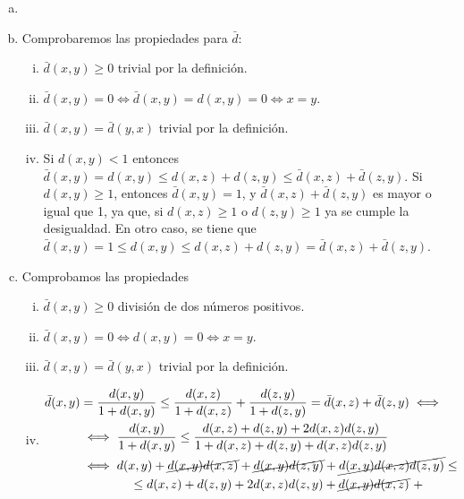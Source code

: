 \begin{eje}
    \begin{enumerate}[(a)]
        \item[]
        \item Comprobaremos las propiedades para $\bar{d}$:
            \begin{enumerate}[i)]
                \item $\bar{d}(x,y) \geq 0$ trivial por la definición.
                \item $\bar{d}(x,y) = 0 \iff \bar{d}(x,y) = d(x,y) = 0 \iff x = y$.
                \item $\bar{d}(x,y) = \bar{d}(y,x)$ trivial por la definición.
                \item Si $d(x,y) < 1$ entonces $\bar{d}(x,y) = d(x,y) \leq d(x,z) + d(z,y) \leq \bar{d}(x,z) + \bar{d}(z,y)$. Si $d(x,y) \geq 1$,
                    entonces $\bar{d}(x,y) = 1$, y $\bar{d}(x,z) + \bar{d}(z,y)$ es mayor o igual que 1, ya que, si $d(x,z) \geq 1$ o
                    $d(z,y) \geq 1$ ya se cumple la desigualdad. En otro caso, se tiene que $\bar{d}(x,y) = 1 \leq d(x,y) \leq d(x,z) + d(z,y) =
                    \bar{d}(x,z) + \bar{d}(z,y)$.
            \end{enumerate}
        \item Comprobamos las propiedades
            \begin{enumerate}[i)]
                \item $\bar{d}(x,y) \geq 0$ división de dos números positivos.
                \item $\bar{d}(x,y) = 0 \iff d(x,y) = 0 \iff x = y$.
                \item $\bar{d}(x,y) = \bar{d}(y,x)$ trivial por la definición.
                \item 
                    \begin{align*}
                        \bar{d}(x,y) &= \frac{d(x,y)}{1 + d(x,y)} \leq \frac{d(x,z)}{1 + d(x,z)} + \frac{d(z,y)}{1 + d(z,y)} =
                        \bar{d}(x,z) + \bar{d}(z,y) \iff \\
                        &\iff \frac{d(x,y)}{1+d(x,y)} \leq \frac{d(x,z) + d(z,y) + 2d(x,z)d(z,y)}{1 + d(x,z) + d(z,y) + d(x,z)d(z,y)} \\
                        &\iff d(x,y) + \cancel{d(x,y)d(x,z)} + \cancel{d(x,y)d(z,y)} + \cancel{d(x,y)d(x,z)d(z,y)} \leq \\
                        &\qquad\qquad\leq d(x,z) + d(z,y) + 2d(x,z)d(z,y) + \cancel{d(x,y)d(x,z)} \,\,+ \\

\end{align*}
\end{enumerate}
\end{enumerate}
\end{eje}
